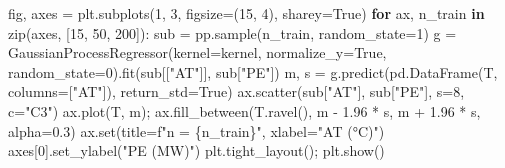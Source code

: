 \documentclass[
  letterpaper,
  DIV=11,
  numbers=noendperiod]{scrreprt}
\newenvironment{Shaded}{\begin{snugshade}}{\end{snugshade}}
\newcommand{\BuiltInTok}[1]{\textcolor[rgb]{0.00,0.23,0.31}{#1}}
\newcommand{\ControlFlowTok}[1]{\textcolor[rgb]{0.00,0.23,0.31}{\textbf{#1}}}
\newcommand{\DecValTok}[1]{\textcolor[rgb]{0.68,0.00,0.00}{#1}}
\newcommand{\FloatTok}[1]{\textcolor[rgb]{0.68,0.00,0.00}{#1}}
\newcommand{\KeywordTok}[1]{\textcolor[rgb]{0.00,0.23,0.31}{\textbf{#1}}}
\newcommand{\NormalTok}[1]{\textcolor[rgb]{0.00,0.23,0.31}{#1}}
\newcommand{\OperatorTok}[1]{\textcolor[rgb]{0.37,0.37,0.37}{#1}}
\newcommand{\SpecialCharTok}[1]{\textcolor[rgb]{0.37,0.37,0.37}{#1}}
\newcommand{\SpecialStringTok}[1]{\textcolor[rgb]{0.13,0.47,0.30}{#1}}
\newcommand{\StringTok}[1]{\textcolor[rgb]{0.13,0.47,0.30}{#1}}
\newcommand{\VariableTok}[1]{\textcolor[rgb]{0.07,0.07,0.07}{#1}}
\begin{document}
\begin{tcolorbox}[enhanced jigsaw, left=2mm, title=\textcolor{quarto-callout-caution-color}{\faFire}\hspace{0.5em}{Solution to Exercise 4}, opacityback=0, breakable, rightrule=.15mm, arc=.35mm, toptitle=1mm, colbacktitle=quarto-callout-caution-color!10!white, opacitybacktitle=0.6, coltitle=black, colframe=quarto-callout-caution-color-frame, bottomrule=.15mm, leftrule=.75mm, bottomtitle=1mm, titlerule=0mm, toprule=.15mm, colback=white]

\begin{Shaded}
\begin{Highlighting}[]
\NormalTok{fig, axes }\OperatorTok{=}\NormalTok{ plt.subplots(}\DecValTok{1}\NormalTok{, }\DecValTok{3}\NormalTok{, figsize}\OperatorTok{=}\NormalTok{(}\DecValTok{15}\NormalTok{, }\DecValTok{4}\NormalTok{), sharey}\OperatorTok{=}\VariableTok{True}\NormalTok{)}
\ControlFlowTok{for}\NormalTok{ ax, n\_train }\KeywordTok{in} \BuiltInTok{zip}\NormalTok{(axes, [}\DecValTok{15}\NormalTok{, }\DecValTok{50}\NormalTok{, }\DecValTok{200}\NormalTok{]):}
\NormalTok{    sub }\OperatorTok{=}\NormalTok{ pp.sample(n\_train, random\_state}\OperatorTok{=}\DecValTok{1}\NormalTok{)}
\NormalTok{    g }\OperatorTok{=}\NormalTok{ GaussianProcessRegressor(kernel}\OperatorTok{=}\NormalTok{kernel, normalize\_y}\OperatorTok{=}\VariableTok{True}\NormalTok{, random\_state}\OperatorTok{=}\DecValTok{0}\NormalTok{).fit(sub[[}\StringTok{"AT"}\NormalTok{]], sub[}\StringTok{"PE"}\NormalTok{])}
\NormalTok{    m, s }\OperatorTok{=}\NormalTok{ g.predict(pd.DataFrame(T, columns}\OperatorTok{=}\NormalTok{[}\StringTok{"AT"}\NormalTok{]), return\_std}\OperatorTok{=}\VariableTok{True}\NormalTok{)}
\NormalTok{    ax.scatter(sub[}\StringTok{"AT"}\NormalTok{], sub[}\StringTok{"PE"}\NormalTok{], s}\OperatorTok{=}\DecValTok{8}\NormalTok{, c}\OperatorTok{=}\StringTok{"C3"}\NormalTok{)}
\NormalTok{    ax.plot(T, m)}\OperatorTok{;}\NormalTok{ ax.fill\_between(T.ravel(), m }\OperatorTok{{-}} \FloatTok{1.96} \OperatorTok{*}\NormalTok{ s, m }\OperatorTok{+} \FloatTok{1.96} \OperatorTok{*}\NormalTok{ s, alpha}\OperatorTok{=}\FloatTok{0.3}\NormalTok{)}
\NormalTok{    ax.}\BuiltInTok{set}\NormalTok{(title}\OperatorTok{=}\SpecialStringTok{f"n = }\SpecialCharTok{\{}\NormalTok{n\_train}\SpecialCharTok{\}}\SpecialStringTok{"}\NormalTok{, xlabel}\OperatorTok{=}\StringTok{"AT (°C)"}\NormalTok{)}
\NormalTok{axes[}\DecValTok{0}\NormalTok{].set\_ylabel(}\StringTok{"PE (MW)"}\NormalTok{)}
\NormalTok{plt.tight\_layout()}\OperatorTok{;}\NormalTok{ plt.show()}
\end{Highlighting}
\end{Shaded}


\end{tcolorbox}
\end{document}
